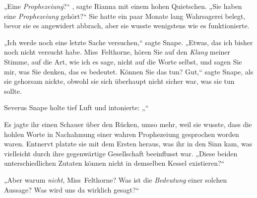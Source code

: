 „Eine \emph{Prophezeiung}?“ , sagte Rianna mit einem hohen Quietschen. „Sie haben eine \emph{Prophezeiung} gehört?“ Sie hatte ein paar Monate lang Wahrsagerei belegt, bevor sie es angewidert abbrach, aber sie wusste wenigstens wie es funktionierte.

„Ich werde noch eine letzte Sache versuchen,“ sagte Snape. „Etwas, das ich bisher noch nicht versucht habe. Miss~Felthorne, hören Sie auf den \emph{Klang} meiner Stimme, auf die Art, wie ich es sage, nicht auf die Worte selbst, und sagen Sie mir, was Sie denken, das es bedeutet. Können Sie das tun? Gut,“ sagte Snape, als sie gehorsam nickte, obwohl sie sich überhaupt nicht sicher war, was sie tun sollte.

Severus Snape holte tief Luft und intonierte: „“

Es jagte ihr einen Schauer über den Rücken, umso mehr, weil sie wusste, dass die hohlen Worte in Nachahmung einer wahren Prophezeiung gesprochen worden waren. Entnervt platzte sie mit dem Ersten heraus, was ihr in den Sinn kam, was vielleicht durch ihre gegenwärtige Gesellschaft beeinflusst war. „Diese beiden unterschiedlichen Zutaten können nicht in demselben Kessel existieren?“

„Aber warum \emph{nicht}, Miss~Felthorne? Was ist die \emph{Bedeutung} einer solchen Aussage? Was wird uns da wirklich gesagt?“

